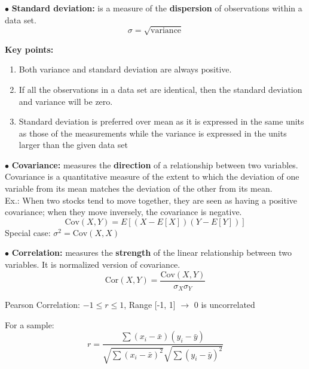 \documentclass[letterpaper, 10.5pt,landscape]{article}
\begin{document}
\begin{multicols*}{3}
$\bullet$ \textbf{Standard deviation: } is a measure of the \textbf{dispersion} of observations within a data set.
\vspace{-3pt}
\[\boxed{\sigma = \sqrt{\text{variance}}} \]

\textbf{Key points: }

\begin{enumerate}
    \vspace{-3pt}
    \item Both variance and standard deviation are always positive.
    \vspace{-3pt}
    \item If all the observations in a data set are identical, then the standard deviation and variance will be zero.
    \vspace{-3pt} 
    \item Standard deviation is preferred over mean as it is expressed in the same units as those of the measurements while the variance is expressed in the units larger than the given data set
\end{enumerate}


$\bullet$ \textbf{Covariance: } measures the \textbf{direction} of a relationship between two variables.\\
Covariance is a quantitative measure of the extent to which the deviation of one variable from its mean matches the deviation of the other from its mean.  \\

Ex.: When two stocks tend to move together, they are seen as having a positive covariance; when they move inversely, the covariance is negative.
\vspace{-5pt}
\[\boxed{\text{Cov}(X,Y) = E \left[\left(X - E[X] \right)  \left( Y- E[Y]  \right)   \right]} \]
\vspace{-3pt}
Special case: \(\boxed{\sigma^{2} = \text{Cov}(X, X)  }\) 

\vspace{5pt}

$\bullet$ \textbf{Correlation:} measures the \textbf{strength} of the linear relationship between two variables. It is normalized version of covariance.
\vspace{-3pt}
\[\boxed{\text{Cor}(X, Y) = \frac{\text{Cov}(X,Y)}{\sigma_{X} \sigma_{Y}}} \]

Pearson Correlation: $-1 \leq r \leq 1$, Range [-1, 1] $\rightarrow$ 0 is uncorrelated


For a sample: 
\vspace{-5pt}
\[\boxed{r = \frac{\sum(x_{i} - \bar{x}) (y_{i} - \bar{y})}{\sqrt{\sum (x_{i} - \bar{x})^{2}} \sqrt{\sum(y_{i} - \bar{y})^{2}}}} \]




\end{multicols*}
\end{document}
